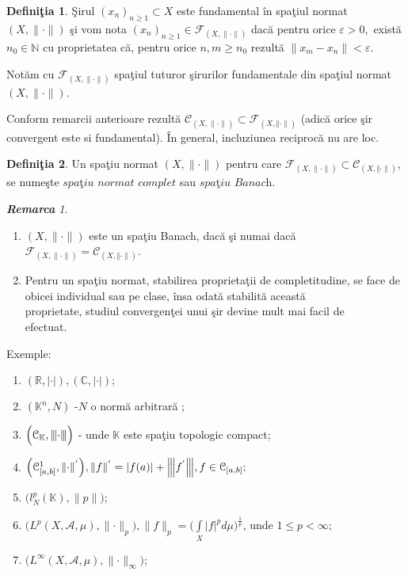 \documentclass[ a4paper, 12pt]{report}
\theoremstyle{definition}
\newtheorem{definition}{\bf Defini\c tia}[section]
\theoremstyle{remark}
\newtheorem{remarc}{\bf Remarca}[section]
\numberwithin{equation}{section}
\begin{document}
\begin{definition}
\c Sirul $(x_n)_{n \geq 1} \subset X$ este fundamental \^in spa\c tiul normat $(X, \lVert \cdot \rVert)$ \c si vom nota $(x_n)_{n \geq 1} \in \mathcal{F}_{(X, \lVert \cdot \rVert)}$ dac\u a pentru orice $\varepsilon >0,$ exist\u a $n_0 \in \mathbb{N}$ cu proprietatea c\u a,  pentru orice $n,m \geq n_0$ rezult\u a $\lVert x_m - x_n \rVert < \varepsilon.$

\smallskip

Not\u am cu $\mathcal{F}_{(X, \lVert \cdot \rVert)}$ spa\c tiul tuturor \c sirurilor fundamentale din spa\c tiul normat $(X, \lVert \cdot \rVert)$.

\smallskip

Conform remarcii anterioare rezult\u a
$\mathcal{C}_{(X, \lVert \cdot \rVert)} \subset \mathcal{F}_{(X, \Vert \cdot \rVert)}$ (adic\u a orice \c sir convergent este si fundamental). 
\^In general, incluziunea reciproc\u a nu are loc.
\end{definition}
\begin{definition}
Un spa\c tiu normat $(X, \lVert \cdot \rVert)$ pentru care $\mathcal{F}_{(X, \lVert \cdot \rVert)} \subset \mathcal{C}_{(X, \Vert \cdot \rVert)}$, se nume\c ste $\textit{spa\c tiu normat complet}$ sau $\textit{spa\c tiu Banach}$.
\end{definition} 
\begin{remarc}
\begin{enumerate}
\item $(X, \lVert \cdot \rVert)$ este un spa\c tiu Banach, dac\u a \c si numai dac\u a $\mathcal{F}_{(X, \lVert \cdot \rVert)} = \mathcal{C}_{(X, \Vert \cdot \rVert)}$.
\item Pentru un spa\c tiu normat, stabilirea proprieta\c tii de completitudine, se face de obicei individual sau pe clase, \^insa odat\u a stabilit\u a aceast\u a\\
 proprietate, studiul convergen\c tei unui \c sir devine mult mai facil de \\
 efectuat. 
\end{enumerate}
\end{remarc}
Exemple:
\begin{enumerate}
\item $(\mathbb{R}, \lvert \cdot \rvert), (\mathbb{C}, \lvert \cdot \rvert);$
\item $(\mathbb{K}^{n}, N)$ -$N$ o norm\u a arbitrar\u a ;
\item $\Big(\mathcal{C}_{\mathbb{K}}, {\left\vert\kern-0.25ex\left\vert\kern-0.25ex\left\vert \cdot \right\vert\kern-0.25ex\right\vert\kern-0.25ex\right\vert}\Big)$ - unde $\mathbb{K}$ este spa\c tiu topologic compact;
\item $\Big(\mathcal{C}_{[a,b]}^{1}, \lVert \cdot \rVert^{'}\Big), \lVert f \rVert^{'} = \lvert f(a) \rvert + {\left\vert\kern-0.25ex\left\vert\kern-0.25ex\left\vert f^{'} \right\vert\kern-0.25ex\right\vert\kern-0.25ex\right\vert}, f \in \mathcal{C}_{[a,b]};$
\item $\Big(l_{N}^{p}(\mathbb{K}), \lVert p \rVert\Big);$ 
\item $\Big( L^{p}(X,\mathcal{A}, \mu), \lVert \cdot \rVert_{p}  \Big), \lVert f \rVert_{p} = \Big( \int\limits_{X} \lvert f \rvert^{p} d\mu \Big )^{\frac{1}{p}}$, unde $1 \leq p < \infty;$
\item $\Big(  L^{\infty}(X,\mathcal{A},\mu), \lVert \cdot \rVert_{\infty}\Big);$
\end{enumerate}
\end{document}
